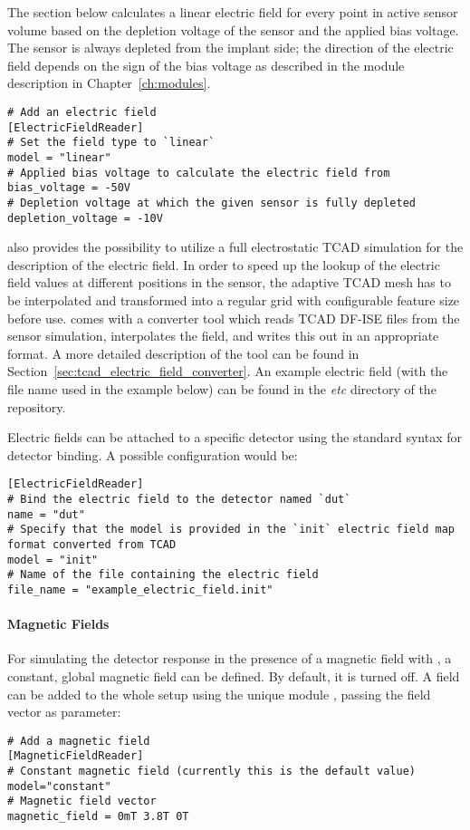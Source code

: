 The section below calculates a linear electric field for every point in active sensor volume based on the depletion voltage of the sensor and the applied bias voltage.
The sensor is always depleted from the implant side; the direction of the electric field depends on the sign of the bias voltage as described in the module description in Chapter~\ref{ch:modules}.
\begin{verbatim}
# Add an electric field
[ElectricFieldReader]
# Set the field type to `linear`
model = "linear"
# Applied bias voltage to calculate the electric field from
bias_voltage = -50V
# Depletion voltage at which the given sensor is fully depleted
depletion_voltage = -10V
\end{verbatim}

\apsq also provides the possibility to utilize a full electrostatic TCAD simulation for the description of the electric field.
In order to speed up the lookup of the electric field values at different positions in the sensor, the adaptive TCAD mesh has to be interpolated and transformed into a regular grid with configurable feature size before use.
\apsq comes with a converter tool which reads TCAD DF-ISE files from the sensor simulation, interpolates the field, and writes this out in an appropriate format.
A more detailed description of the tool can be found in Section~\ref{sec:tcad_electric_field_converter}.
An example electric field (with the file name used in the example below) can be found in the \textit{etc} directory of the \apsq repository.

Electric fields can be attached to a specific detector using the standard syntax for detector binding.
A possible configuration would be:
\begin{verbatim}
[ElectricFieldReader]
# Bind the electric field to the detector named `dut`
name = "dut"
# Specify that the model is provided in the `init` electric field map format converted from TCAD
model = "init"
# Name of the file containing the electric field
file_name = "example_electric_field.init"
\end{verbatim}

\paragraph{Magnetic Fields}
\label{sec:module_magnetic_field}

For simulating the detector response in the presence of a magnetic field with \apsq, a constant, global magnetic field can be defined. By default, it is turned off. A field can be added to the whole setup using the unique module , passing the field vector as parameter:
\begin{verbatim}
# Add a magnetic field
[MagneticFieldReader]
# Constant magnetic field (currently this is the default value)
model="constant"
# Magnetic field vector
magnetic_field = 0mT 3.8T 0T
\end{verbatim}

